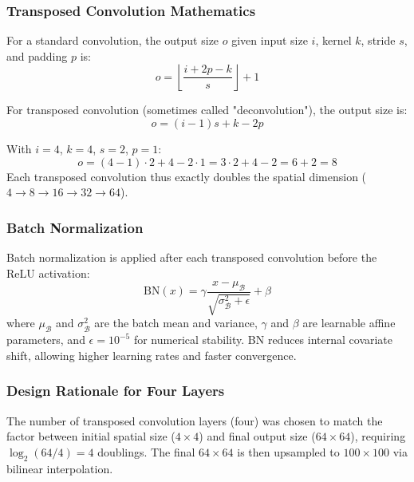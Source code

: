 \documentclass[12pt,a4paper,oneside]{report}
\begin{document}
\subsubsection{Transposed Convolution Mathematics}

For a standard convolution, the output size $o$ given input size $i$, kernel $k$, stride $s$, and padding $p$ is:
\begin{equation}
o = \left\lfloor \frac{i + 2p - k}{s} \right\rfloor + 1
\end{equation}

For transposed convolution (sometimes called "deconvolution"), the output size is:
\begin{equation}
o = (i - 1)s + k - 2p
\end{equation}

With $i=4$, $k=4$, $s=2$, $p=1$:
\begin{equation}
o = (4 - 1)\cdot 2 + 4 - 2\cdot 1 = 3\cdot 2 + 4 - 2 = 6 + 2 = 8
\end{equation}
Each transposed convolution thus exactly doubles the spatial dimension ($4 \rightarrow 8 \rightarrow 16 \rightarrow 32 \rightarrow 64$).

\subsubsection{Batch Normalization}

Batch normalization is applied after each transposed convolution before the ReLU activation:
\begin{equation}
\text{BN}(x) = \gamma \frac{x - \mu_{\mathcal{B}}}{\sqrt{\sigma_{\mathcal{B}}^2 + \epsilon}} + \beta
\end{equation}
where $\mu_{\mathcal{B}}$ and $\sigma_{\mathcal{B}}^2$ are the batch mean and variance, $\gamma$ and $\beta$ are learnable affine parameters, and $\epsilon = 10^{-5}$ for numerical stability. BN reduces internal covariate shift, allowing higher learning rates and faster convergence.

\subsubsection{Design Rationale for Four Layers}

The number of transposed convolution layers (four) was chosen to match the factor between initial spatial size ($4 \times 4$) and final output size ($64 \times 64$), requiring $\log_2(64/4) = 4$ doublings. The final $64 \times 64$ is then upsampled to $100 \times 100$ via bilinear interpolation.
\end{document}
